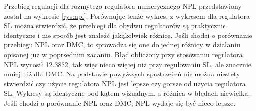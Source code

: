 	Przebieg regulacji dla rozmytego regulatora numerycznego NPL przedstawiony został na wykresie \ref{rys:npl}. Porównując tenże wykres, z wykresem dla regulatora SL można stwierdzić, że przebiegi dla obydwu regulatorów są praktycznie identyczne i nie sposób jest znaleźć jakąkolwiek różnicę. Jeśli chodzi o porównanie przebiegu NPL oraz DMC, to sprowadza się one do jednej różnicy w działaniu opisanej już w poprzednim zadaniu. Błąd obliczony przy stosowaniu regulatora NPL wynosił 12.3832, tak więc nieco więcej niż przy regulowaniu SL, ale znacznie mniej niż dla DMC. Na podstawie powyższych spostrzeżeń nie można niestety stwierdzić czy użycie regulatora NPL jest lepsze czy gorsze od użycia regulatora SL. Wykresy są identyczne pod kątem wizualnym, a różnica w błędach niewielka. Jeśli chodzi o porównanie NPL oraz DMC, NPL wydaje się być nieco lepsze.